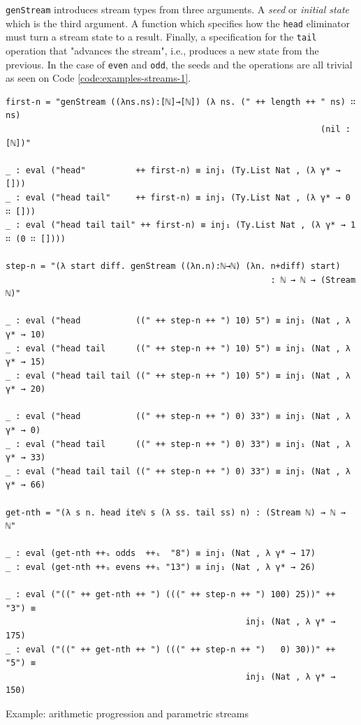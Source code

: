 \verb$genStream$ introduces stream types from three arguments. A \textit{seed} or \textit{initial state} which is the third argument. A function which specifies how the \verb$head$ eliminator must turn a stream state to a result. Finally, a specification for the \verb$tail$ operation that "advances the stream", i.e., produces a new state from the previous. In the case of \verb$even$ and \verb$odd$, the seeds and the operations are all trivial as seen on Code \ref{code:examples-streams-1}.

\begin{listing}[H]
\begin{verbatim}
first-n = "genStream ((λns.ns):[ℕ]→[ℕ]) (λ ns. (" ++ length ++ " ns) ∷ ns)
                                                               (nil : [ℕ])"

_ : eval ("head"          ++ first-n) ≡ inj₁ (Ty.List Nat , (λ γ* → []))
_ : eval ("head tail"     ++ first-n) ≡ inj₁ (Ty.List Nat , (λ γ* → 0 ∷ []))
_ : eval ("head tail tail" ++ first-n) ≡ inj₁ (Ty.List Nat , (λ γ* → 1 ∷ (0 ∷ [])))

step-n = "(λ start diff. genStream ((λn.n):ℕ→ℕ) (λn. n+diff) start)
                                                     : ℕ → ℕ → (Stream ℕ)"

_ : eval ("head           ((" ++ step-n ++ ") 10) 5") ≡ inj₁ (Nat , λ γ* → 10)
_ : eval ("head tail      ((" ++ step-n ++ ") 10) 5") ≡ inj₁ (Nat , λ γ* → 15)
_ : eval ("head tail tail ((" ++ step-n ++ ") 10) 5") ≡ inj₁ (Nat , λ γ* → 20)

_ : eval ("head           ((" ++ step-n ++ ") 0) 33") ≡ inj₁ (Nat , λ γ* → 0)
_ : eval ("head tail      ((" ++ step-n ++ ") 0) 33") ≡ inj₁ (Nat , λ γ* → 33)
_ : eval ("head tail tail ((" ++ step-n ++ ") 0) 33") ≡ inj₁ (Nat , λ γ* → 66)

get-nth = "(λ s n. head iteℕ s (λ ss. tail ss) n) : (Stream ℕ) → ℕ → ℕ"

_ : eval (get-nth ++ₛ odds  ++ₛ  "8") ≡ inj₁ (Nat , λ γ* → 17)
_ : eval (get-nth ++ₛ evens ++ₛ "13") ≡ inj₁ (Nat , λ γ* → 26)

_ : eval ("((" ++ get-nth ++ ") (((" ++ step-n ++ ") 100) 25))" ++ "3") ≡
                                                inj₁ (Nat , λ γ* → 175)
_ : eval ("((" ++ get-nth ++ ") (((" ++ step-n ++ ")   0) 30))" ++ "5") ≡
                                                inj₁ (Nat , λ γ* → 150)
\end{verbatim}
\caption{Example: arithmetic progression and parametric streams}
\label{code:examples-streams-2}
\end{listing}

